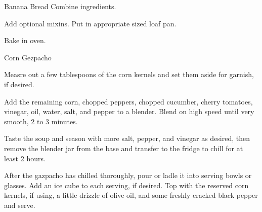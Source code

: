 \documentclass[letterpaper]{book}
\begin{document}
\begin{recipe}{Banana Bread}{}{}
    Combine ingredients.

    Add optional mixins.
    \newstep
    Put in appropriate sized loaf pan.

    \newstep
    Bake in oven.
\end{recipe}

\begin{recipe}{Corn Gezpacho}{}{}

    Measre out a few tablespoons of the corn kernels and set them aside for garnish, if desired.


    Add the remaining corn, chopped peppers, chopped cucumber, cherry tomatoes, vinegar, oil, water, salt, and pepper to a blender.
    Blend on high speed until very smooth, 2 to 3 minutes.

    \newstep

    Taste the soup and season with more salt, pepper, and vinegar as desired, then remove the blender jar from the base and transfer to the fridge to chill for at least 2 hours.


    After the gazpacho has chilled thoroughly, pour or ladle it into serving bowls or glasses. Add an ice cube to each serving, if desired.
    Top with the reserved corn kernels, if using, a little drizzle of olive oil, and some freshly cracked black pepper and serve.

\end{recipe}
\end{document}
